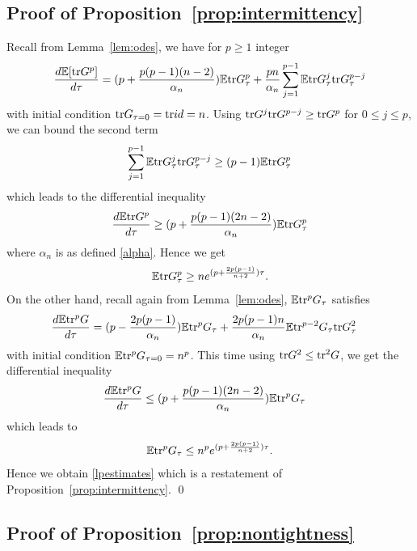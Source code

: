 \documentclass[english, letterpaper,12pt,reqno]{amsart}
\theoremstyle{remark}
\theoremstyle{plain}
\newcommand{\1}{\mathbf{1}}
\def\bbE{\mathbb E}
\def\tr{{\rm tr}}
\begin{document}
\subsection{Proof of Proposition~\ref{prop:intermittency}}
Recall from Lemma~\ref{lem:odes}, we have for $p\geq 1$ integer
%
\begin{align*}
  \frac{  d\bbE[\tr  G^p]}{d\tau} =(p+\frac{p(p-1)(n-2)}{\alpha_n})\bbE \tr  G_\tau^p  +\frac{pn}{\alpha_n}\sum_{j=1}^{p-1}\bbE \tr  G_\tau^j \tr  G_\tau^{p-j} 
\end{align*}
%
 with initial condition $\tr G_{\tau=0}=\tr id=n$. Using $\tr  G^j \tr  G^{p-j} \geq \tr  G^p$ for $0\leq j\leq p$, we can bound the second term 
 \begin{align*}
    \sum_{j=1}^{p-1}\bbE \tr  G_\tau^j \tr  G_\tau^{p-j} \geq (p-1) \bbE \tr G_\tau^p
\end{align*}
%
which leads to the differential inequality 
%
\begin{align*}
      \frac{  d\bbE\tr  G^p}{d\tau} \geq (p+\frac{p(p-1)(2n-2)}{\alpha_n}) \bbE\tr  G_\tau^p
\end{align*}
%
where $\alpha_n$ is as defined \eqref{alpha}. Hence we get 
%
\begin{align*}
   \bbE\tr  G_\tau^p \geq n e^{(p+\frac{2p(p-1)}{n+2})\tau} .
\end{align*}
%
On the other hand, recall again from Lemma~\ref{lem:odes}, $\bbE \tr^p G_\tau$ satisfies  
%
\begin{align*}
 \frac{ d\bbE\tr^p G}{d\tau}& =(p-\frac{2p(p-1)}{\alpha_n}) \bbE\tr^p G_\tau +\frac{2p(p-1)n}{\alpha_n}  \bbE\tr^{p-2} G_\tau\tr  G_\tau^2 
\end{align*}
%
with initial condition $\bbE\tr^p G_{\tau=0}=n^p$. This time using $\tr  G^2\leq \tr^2  G$, we get the differential inequality
%
\begin{align*}
   \frac{d\bbE \tr^p  G}{d\tau}& \leq (p+\frac{p(p-1)(2n-2)}{\alpha_n}) \bbE\tr^p  G_\tau 
\end{align*}
%
which leads to
%
\begin{align*}
   \bbE\tr^p  G_\tau \leq n^pe^{(p+\frac{2p(p-1)}{n+2})\tau} .
\end{align*}
%
Hence we obtain \eqref{lpestimates} which is a restatement of Proposition~\ref{prop:intermittency}.
\qed
%








\subsection{Proof of Proposition~\ref{prop:nontightness}} 
\end{document}
